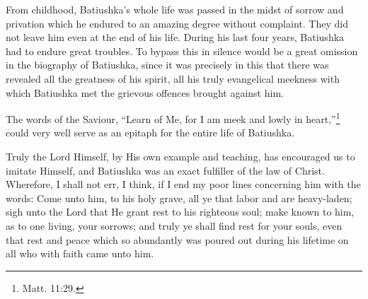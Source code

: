 From childhood, Batiushka's whole life was passed in the midst of sorrow and privation which he endured to an amazing degree without complaint. They did not leave him even at the end of his life. During his last four years, Batiushka had to endure great troubles. To bypass this in silence would be a great omission in the biography of Batiushka, since it was precisely in this that there was revealed all the greatness of his spirit, all his truly evangelical meekness with which Batiushka met the grievous offences brought against him.

The words of the Saviour, “Learn of Me, for I am meek and lowly in heart,''\footnote{Matt. 11:29.} could very well serve as an epitaph for the entire life of Batiushka.

Truly the Lord Himself, by His own example and teaching, has encouraged us to imitate Himself, and Batiushka was an exact fulfiller of the law of Christ. Wherefore, I shall not err, I think, if I end my poor lines concerning him with the words: Come unto him, to his holy grave, all ye that labor and are heavy-laden; sigh unto the Lord that He grant rest to his righteous soul; make known to him, as to one living, your sorrows; and truly ye shall find rest for your souls, even that rest and peace which so abundantly was poured out during his lifetime on all who with faith came unto him.